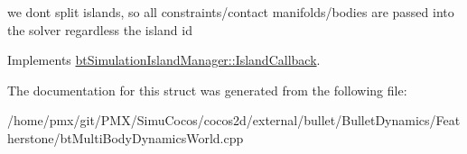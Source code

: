 we don\textquotesingle{}t split islands, so all constraints/contact manifolds/bodies are passed into the solver regardless the island id 

Implements \hyperlink{structbtSimulationIslandManager_1_1IslandCallback}{bt\+Simulation\+Island\+Manager\+::\+Island\+Callback}.



The documentation for this struct was generated from the following file\+:\begin{DoxyCompactItemize}
\item 
/home/pmx/git/\+P\+M\+X/\+Simu\+Cocos/cocos2d/external/bullet/\+Bullet\+Dynamics/\+Featherstone/bt\+Multi\+Body\+Dynamics\+World.\+cpp\end{DoxyCompactItemize}
